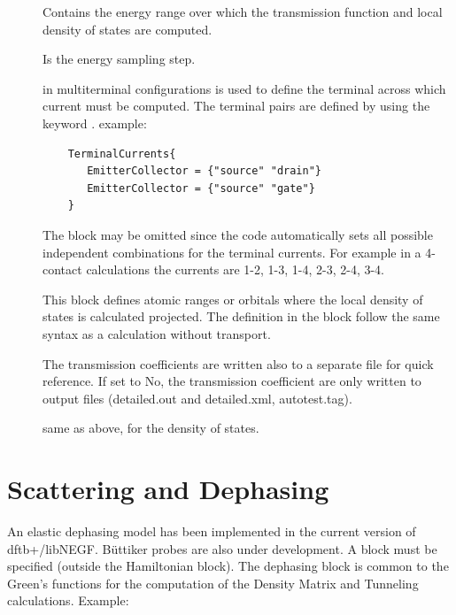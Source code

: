\begin{description}


\item[] Contains the energy range over
  which the transmission function and local density of states are computed.
\item[] Is the energy sampling step.
\item[] in multiterminal configurations is used to define
  the terminal across which current must be computed. The terminal pairs are
  defined by using the keyword . example:

   \begin{verbatim}
    TerminalCurrents{
       EmitterCollector = {"source" "drain"}
       EmitterCollector = {"source" "gate"}
    }
  \end{verbatim}

  The block  may be omitted since the code automatically
  sets all possible independent combinations for the terminal currents. For
  example in a 4-contact calculations the currents are 1-2, 1-3, 1-4, 2-3, 2-4,
  3-4.
\item[] \label{Region} This block defines atomic ranges or orbitals
  where the local density of states is calculated projected. The definition in
  the block follow the same syntax as a \dftbp{} calculation without transport.
\item[] The transmission coefficients are written also to a
  separate file for quick reference. If set to No, the transmission coefficient
  are only written to \dftbp{} output files (detailed.out and detailed.xml,
  autotest.tag).
\item[] same as above, for the density of states.

\end{description}

\section{Scattering and Dephasing}

An elastic dephasing model has been implemented in the current
version of dftb+/libNEGF. B\"uttiker probes are also under development.
A  block must be specified (outside the Hamiltonian block).
The dephasing block is common to the Green's functions for the computation
of the Density Matrix and Tunneling calculations.
Example:

